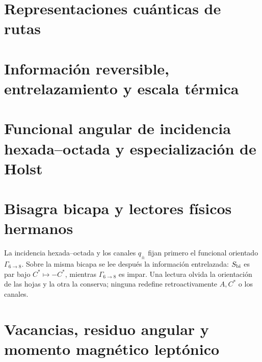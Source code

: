 \chapter{Representaciones cuánticas de rutas}
\label{chap:estadistica-cuantica-rev7}
\HMTDemoteHeadings
\def\HMTIncludeParticleQuantum{1}

\let\HMTIncludeParticleQuantum\undefined





\HMTRestoreHeadings

\chapter{Información reversible, entrelazamiento y escala térmica}
\label{chap:informacion-temperatura-rev7}
\HMTDemoteHeadings


\HMTRestoreHeadings

\chapter{Funcional angular de incidencia hexada--octada y especialización de Holst}
\label{chap:barbero-rev7}
\HMTDemoteHeadings

\HMTRestoreHeadings

\chapter{Bisagra bicapa y lectores físicos hermanos}
\label{chap:bisagra-bicapa-rev8}
La incidencia hexada--octada y los canales \(q_\pm\) fijan primero el
funcional orientado \(\Gamma_{6\to8}\). Sobre la misma bicapa se lee después
la información entrelazada: \(S_{\rm bi}\) es par bajo
\(C^*\mapsto-C^*\), mientras \(\Gamma_{6\to8}\) es impar. Una lectura olvida
la orientación de las hojas y la otra la conserva; ninguna redefine
retroactivamente \(A,C^*\) o los canales.
\HMTDemoteHeadings

\HMTRestoreHeadings

\chapter{Vacancias, residuo angular y momento magnético leptónico}
\label{chap:vacancias-radion-g2-rev7}
\HMTDemoteHeadings

\HMTRestoreHeadings

